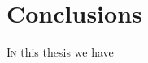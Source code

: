 \section[Conclusions]
{Conclusions}


\lettrine[lines=2, findent=3pt, nindent=0pt]{I}{n} this thesis we have 
